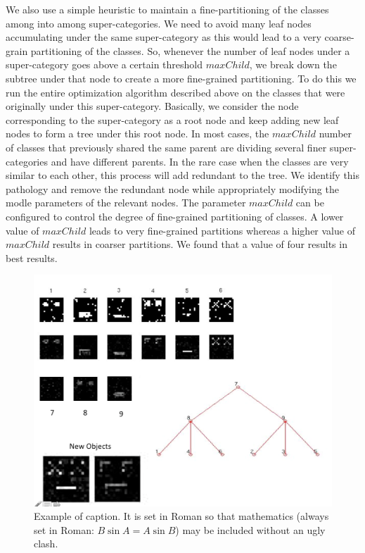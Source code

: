 \documentclass[10pt,twocolumn,letterpaper]{article}
\begin{document}
We also use a simple heuristic to maintain a fine-partitioning of the classes among into among super-categories. 
We need to avoid many leaf nodes accumulating under the 
same super-category as this would lead to a very coarse-grain partitioning of the classes.  So, whenever the number of leaf nodes under a 
super-category goes above a certain threshold $maxChild$, we break down the subtree under that node to create
 a more fine-grained partitioning.  To do this we run the entire optimization algorithm described above on the classes that were originally under this
 super-category. Basically, we consider the node corresponding to the super-category as a root node and keep adding new leaf nodes 
 to form a tree under this root node. In most cases, the $maxChild$ number of classes that previously shared the same parent are dividing
 several finer super-categories and have different parents.  In the rare case when the classes are very similar to each other, this process will add
 redundant to the tree. We identify this pathology and remove the redundant node while appropriately modifying the modle parameters of the 
 relevant nodes. The parameter $maxChild$ can be configured to control the degree of fine-grained partitioning of classes. A lower value
 of $maxChild$ leads to very fine-grained partitions whereas a higher value of $maxChild$ results in coarser partitions. We found that 
 a value of four results in best results. 
 
 \begin{figure}[t]
 	\begin{center}
 		\includegraphics[width=0.8\linewidth]{smiley}
 	\end{center}
 	\caption{Example of caption.  It is set in Roman so that mathematics
 		(always set in Roman: $B \sin A = A \sin B$) may be included without an
 		ugly clash.}
 	\label{fig:long}
 	\label{fig:onecol}
 \end{figure}
\end{document}
